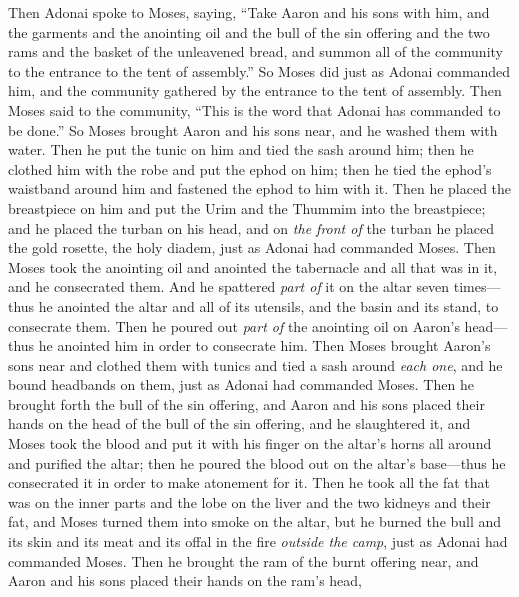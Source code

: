 \begin{biblechapter} %
 Then Adonai spoke to Moses, saying,
\verse “Take Aaron and his sons with him, and the garments and the anointing oil and the bull of the sin offering and the two rams and the basket of the unleavened bread,
\verse and summon all of the community to the entrance to the tent of assembly.”
\verse So Moses did just as Adonai commanded him, and the community gathered by the entrance to the tent of assembly.
\verse Then Moses said to the community, “This is the word that Adonai has commanded to be done.”
\verse So Moses brought Aaron and his sons near, and he washed them with water.
\verse Then he put the tunic on him and tied the sash around him; then he clothed him with the robe and put the ephod on him; then he tied the ephod’s waistband around him and fastened the ephod to him with it.
\verse Then he placed the breastpiece on him and put the Urim and the Thummim into the breastpiece;
\verse and he placed the turban on his head, and on \textit{the front of} the turban he placed the gold rosette, the holy diadem, just as Adonai had commanded Moses.
\verse Then Moses took the anointing oil and anointed the tabernacle and all that was in it, and he consecrated them.
\verse And he spattered \textit{part of} it on the altar seven times—thus he anointed the altar and all of its utensils, and the basin and its stand, to consecrate them.
\verse Then he poured out \textit{part of} the anointing oil on Aaron’s head—thus he anointed him in order to consecrate him.
\verse Then Moses brought Aaron’s sons near and clothed them with tunics and tied a sash around \textit{each one}, and he bound headbands on them, just as Adonai had commanded Moses.
 Then he brought forth the bull of the sin offering, and Aaron and his sons placed their hands on the head of the bull of the sin offering,
\verse and he slaughtered it, and Moses took the blood and put it with his finger on the altar’s horns all around and purified the altar; then he poured the blood out on the altar’s base—thus he consecrated it in order to make atonement for it.
\verse Then he took all the fat that was on the inner parts and the lobe on the liver and the two kidneys and their fat, and Moses turned them into smoke on the altar,
\verse but he burned the bull and its skin and its meat and its offal in the fire \textit{outside the camp}, just as Adonai had commanded Moses.
\verse Then he brought the ram of the burnt offering near, and Aaron and his sons placed their hands on the ram’s head,

\end{biblechapter}
